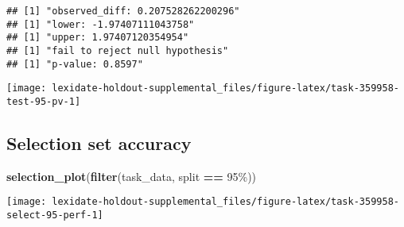 \documentclass[
]{book}
\newenvironment{Shaded}{\begin{snugshade}}{\end{snugshade}}
\newcommand{\AttributeTok}[1]{\textcolor[rgb]{0.13,0.29,0.53}{#1}}
\newcommand{\DecValTok}[1]{\textcolor[rgb]{0.00,0.00,0.81}{#1}}
\newcommand{\FunctionTok}[1]{\textcolor[rgb]{0.13,0.29,0.53}{\textbf{#1}}}
\newcommand{\NormalTok}[1]{#1}
\newcommand{\OtherTok}[1]{\textcolor[rgb]{0.56,0.35,0.01}{#1}}
\newcommand{\SpecialCharTok}[1]{\textcolor[rgb]{0.81,0.36,0.00}{\textbf{#1}}}
\newcommand{\StringTok}[1]{\textcolor[rgb]{0.31,0.60,0.02}{#1}}
\begin{document}
\begin{Shaded}
\end{Shaded}

\begin{verbatim}
## [1] "observed_diff: 0.207528262200296"
## [1] "lower: -1.97407111043758"
## [1] "upper: 1.97407120354954"
## [1] "fail to reject null hypothesis"
## [1] "p-value: 0.8597"
\end{verbatim}

\texttt{[image: lexidate-holdout-supplemental\_files/figure-latex/task-359958-test-95-pv-1]}

\hypertarget{selection-set-accuracy-34}{%
\subsection{Selection set accuracy}\label{selection-set-accuracy-34}}

\begin{Shaded}
\begin{Highlighting}[]
\FunctionTok{selection\_plot}\NormalTok{(}\FunctionTok{filter}\NormalTok{(task\_data, split }\SpecialCharTok{==} \StringTok{\textquotesingle{}95\%\textquotesingle{}}\NormalTok{))}
\end{Highlighting}
\end{Shaded}

\texttt{[image: lexidate-holdout-supplemental\_files/figure-latex/task-359958-select-95-perf-1]}
\end{document}
